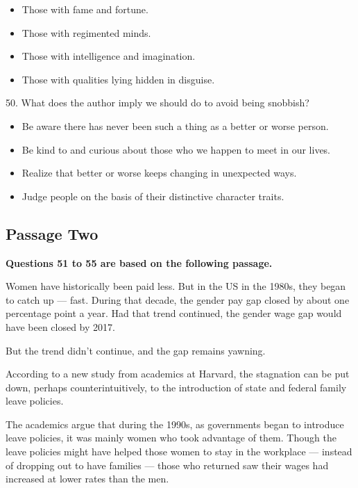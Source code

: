 \documentclass[UTF8,11pt]{ctexart}
\begin{document}
\begin{itemize}[leftmargin=2em,itemsep=.2em,topsep=.4em]\item[A.] Those with fame and fortune.
\item[B.] Those with regimented minds.
\item[C.] Those with intelligence and imagination.
\item[D.] Those with qualities lying hidden in disguise.
\end{itemize}

50. What does the author imply we should do to avoid being snobbish?


\begin{itemize}[leftmargin=2em,itemsep=.2em,topsep=.4em]\item[A.] Be aware there has never been such a thing as a better or worse person.
\item[B.] Be kind to and curious about those who we happen to meet in our lives.
\item[C.] Realize that better or worse keeps changing in unexpected ways.
\item[D.] Judge people on the basis of their distinctive character traits.
\end{itemize}

\subsection*{\textbf{Passage Two}}


\textbf{Questions 51 to 55 are based on the following passage.}


Women have historically been paid less. But in the US in the 1980s, they began to catch up — fast. During that decade, the gender pay gap closed by about one percentage point a year. Had that trend continued, the gender wage gap would have been closed by 2017.


But the trend didn’t continue, and the gap remains yawning.


According to a new study from academics at Harvard, the stagnation can be put down, perhaps counterintuitively, to the introduction of state and federal family leave policies.


The academics argue that during the 1990s, as governments began to introduce leave policies, it was mainly women who took advantage of them. Though the leave policies might have helped those women to stay in the workplace — instead of dropping out to have families — those who returned saw their wages had increased at lower rates than the men.
\end{document}

